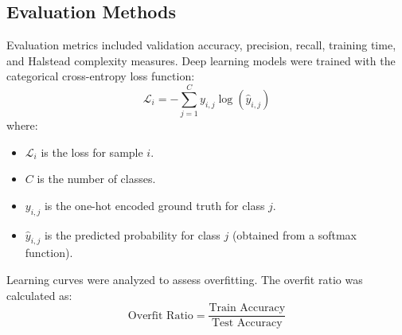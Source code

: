 \documentclass[conference]{IEEEtran}
\begin{document}
\subsection{Evaluation Methods}
Evaluation metrics included validation accuracy, precision, recall, training time, and Halstead complexity measures. Deep learning models were trained with the categorical cross-entropy loss function:
\begin{equation}
    \mathcal{L}_i = - \sum_{j=1}^{C} y_{i,j} \log(\hat{y}_{i,j})
\end{equation}
where:
\begin{itemize}
    \item $\mathcal{L}_i$ is the loss for sample $i$.
    \item $C$ is the number of classes.
    \item $y_{i,j}$ is the one-hot encoded ground truth for class $j$.
    \item $\hat{y}_{i,j}$ is the predicted probability for class $j$ (obtained from a softmax function).
\end{itemize}
Learning curves were analyzed to assess overfitting. The overfit ratio was calculated as:
\begin{equation}
    \text{Overfit Ratio} = \frac{\text{Train Accuracy}}{\text{Test Accuracy}}
\end{equation}
\end{document}
